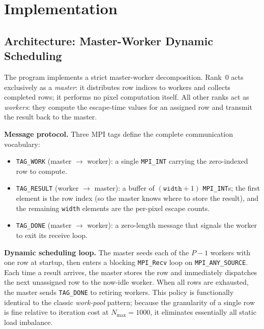\documentclass[11pt]{article}
\begin{document}
\section{Implementation}

\subsection{Architecture: Master-Worker Dynamic Scheduling}

The program implements a strict master-worker decomposition. Rank~0 acts
exclusively as a \textit{master}: it distributes row indices to workers and
collects completed rows; it performs no pixel computation itself. All other
ranks act as \textit{workers}: they compute the escape-time values for an
assigned row and transmit the result back to the master.

\textbf{Message protocol.} Three MPI tags define the complete communication
vocabulary:
\begin{itemize}
  \item \texttt{TAG\_WORK} (master $\to$ worker): a single \texttt{MPI\_INT}
        carrying the zero-indexed row to compute.
  \item \texttt{TAG\_RESULT} (worker $\to$ master): a buffer of
        $(\texttt{width} + 1)$ \texttt{MPI\_INT}s; the first element is the
        row index (so the master knows where to store the result), and the
        remaining \texttt{width} elements are the per-pixel escape counts.
  \item \texttt{TAG\_DONE} (master $\to$ worker): a zero-length message that
        signals the worker to exit its receive loop.
\end{itemize}

\textbf{Dynamic scheduling loop.} The master seeds each of the $P-1$ workers
with one row at startup, then enters a blocking \texttt{MPI\_Recv} loop on
\texttt{MPI\_ANY\_SOURCE}. Each time a result arrives, the master stores the
row and immediately dispatches the next unassigned row to the now-idle worker.
When all rows are exhausted, the master sends \texttt{TAG\_DONE} to retiring
workers. This policy is functionally identical to the classic \textit{work-pool}
pattern; because the granularity of a single row is fine relative to iteration
cost at $N_{\max}=1000$, it eliminates essentially all static load imbalance.
\end{document}
